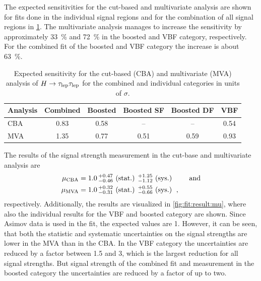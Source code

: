 The expected sensitivities for the cut-based and multivariate analysis are shown for fits done in the individual signal regions
and for the combination of all signal regions in \cref{tab:fit:result:sigma}.
The multivariate analysis manages to increase the sensitivity by approximately \SI{33}{\percent} and \SI{72}{\percent} in the boosted and VBF category, respectively.
For the combined fit of the boosted and VBF category the increase is about \SI{63}{\percent}.

\begin{table}[htpb]
    \centering
    \caption{Expected sensitivity for the cut-based (CBA) and multivariate (MVA) analysis of $H \to \tau_\text{lep} \tau_\text{lep}$ for the combined and individual categories in units of $\sigma$.}\label{tab:fit:result:sigma}
    \begin{tabular}{lccccc}
        \toprule
        Analysis & Combined & Boosted & Boosted SF & Boosted DF & {VBF} \\ \midrule
        CBA      & 0.83     & 0.58    & --         & --         & 0.54  \\
        MVA      & 1.35     & 0.77    & 0.51       & 0.59       & 0.93  \\
        \bottomrule
    \end{tabular}
\end{table}

The results of the signal strength measurement in the cut-base and multivariate analysis are
\begin{align}
    \mu_\text{CBA} &= 1.0\, {}^{+{0.47}}_{-{0.46}} \text{ (stat.) } {}^{+{1.25}}_{-{1.12}} \text{ (sys.) }  \qquad \text{and} \\
    \mu_\text{MVA} &= 1.0\, {}^{+{0.32}}_{-{0.31}} \text{ (stat.) } {}^{+{0.55}}_{-{0.66}} \text{ (sys.) }  \,,
\end{align}
respectively.
Additionally, the results are visualized in \cref{fig:fit:result:mu}, where also the individual results for the VBF and boosted category are shown.
Since Asimov data is used in the fit, the expected values are 1.
However, it can be seen, that both the statistic and systematic uncertainties on the signal strengths are lower in the MVA than in the CBA\@.
In the VBF category the uncertainties are reduced by a factor between 1.5 and 3, which is the largest reduction for all signal strengths.
But signal strength of the combined fit and measurement in the boosted category the uncertainties are reduced by a factor of up to two.



